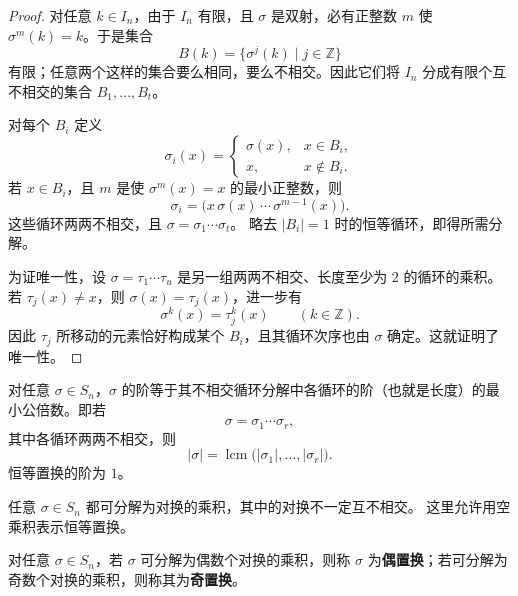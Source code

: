\begin{proof}
对任意 $k\in I_n$，由于 $I_n$ 有限，且 $\sigma$ 是双射，必有正整数 $m$ 使 $\sigma^m(k)=k$。于是集合
\[
  B(k)=\{\sigma^j(k)\mid j\in\mathbb Z\}
\]
有限；任意两个这样的集合要么相同，要么不相交。因此它们将 $I_n$ 分成有限个互不相交的集合 $B_1,\ldots,B_t$。

对每个 $B_i$ 定义
\[
  \sigma_i(x)=
  \begin{cases}
    \sigma(x),&x\in B_i,\\
    x,&x\notin B_i.
  \end{cases}
\]
若 $x\in B_i$，且 $m$ 是使 $\sigma^m(x)=x$ 的最小正整数，则
\[
  \sigma_i=\bigl(x\,\sigma(x)\,\cdots\,\sigma^{m-1}(x)\bigr).
\]
这些循环两两不相交，且 $\sigma=\sigma_1\cdots\sigma_t$。
略去 $|B_i|=1$ 时的恒等循环，即得所需分解。

为证唯一性，设 $\sigma=\tau_1\cdots\tau_u$ 是另一组两两不相交、长度至少为 $2$ 的循环的乘积。若 $\tau_j(x)\neq x$，则 $\sigma(x)=\tau_j(x)$，进一步有
\[
  \sigma^k(x)=\tau_j^k(x)\qquad(k\in\mathbb Z).
\]
因此 $\tau_j$ 所移动的元素恰好构成某个 $B_i$，且其循环次序也由 $\sigma$ 确定。这就证明了唯一性。
\end{proof}

\begin{corollary}\label{cor:permutation-order}
对任意 $\sigma\in S_n$，$\sigma$ 的阶等于其不相交循环分解中各循环的阶（也就是长度）的最小公倍数。即若
\[
  \sigma=\sigma_1\cdots\sigma_r,
\]
其中各循环两两不相交，则
\[
  |\sigma|=\operatorname{lcm}\bigl(|\sigma_1|,\ldots,|\sigma_r|\bigr).
\]
恒等置换的阶为 $1$。
\end{corollary}

\begin{corollary}\label{cor:transposition-decomposition}
任意 $\sigma\in S_n$ 都可分解为对换的乘积，其中的对换不一定互不相交。
这里允许用空乘积表示恒等置换。
\end{corollary}

\begin{definition}[偶置换与奇置换]\label{def:permutation-parity}
对任意 $\sigma\in S_n$，若 $\sigma$ 可分解为偶数个对换的乘积，则称 $\sigma$ 为\textbf{偶置换}；若可分解为奇数个对换的乘积，则称其为\textbf{奇置换}。
\end{definition}

